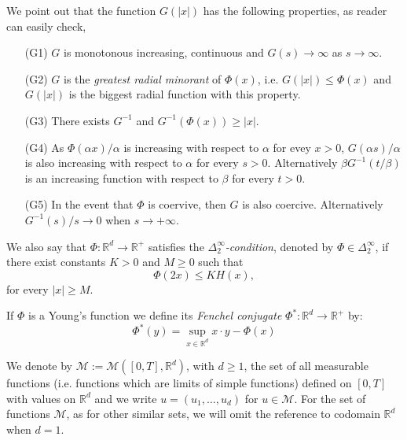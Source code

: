 \documentclass[twoside]{article}
\makeatletter
\theoremstyle{remark}
\def\namedlabel#1#2{\begingroup
    #2%
    \def\@currentlabel{#2}%
    \phantomsection\label{#1}\endgroup
}
\newcommand{\rr}{\mathbb{R}}
\renewcommand{\leq}{\leqslant}
\renewcommand{\geq}{\geqslant}
\makeatother
\begin{document}
We point out that the function $G(|x|)$ has the following properties, as reader can easily check,
\begin{enumerate}
 \item[\namedlabel{it:g1}{(G1)}] $G$ is monotonous increasing, continuous and $G(s) \to \infty$ as $s \to \infty$.
 \item[\namedlabel{it:g2}{(G2)}] $G$ is the \emph{greatest radial minorant} of $\Phi(x)$, i.e.  $G(|x|)\leq \Phi (x)$ and $G(|x|)$ is the biggest radial function with this property.
 \item[\namedlabel{it:g3}{(G3)}] There exists  $G^{-1}$ and  $G^{-1}(\Phi(x))\geq |x|$.
 \item[\namedlabel{it:g4}{(G4)}] As $\Phi(\alpha x)/\alpha$ is increasing with respect to $\alpha$ for evey $x>0$,
$G(\alpha s)/\alpha$ is also increasing
with respect to $\alpha$ for every $s>0$. Alternatively  $\beta G^{-1}(t/\beta)$ is an increasing function with respect to
$\beta$ for every $t>0$.
\item[\namedlabel{it:g5}{(G5)}] In the event that $\Phi$ is coervive, then $G$ is also coercive. Alternatively $G^{-1}(s)/s\to 0$ when $s\to+\infty$.
\end{enumerate}





We also say that $\Phi:\mathbb{R}^d\rightarrow \mathbb{R}^+$ satisfies the  \emph{$\Delta_2^{\infty}$-condition}, denoted by $\Phi \in \Delta_2^{\infty}$,
if there exist  constants $K>0$ and  $M\geq 0$ such that
\begin{equation}\label{delta2defi}\Phi(2x)\leq KH(x),
\end{equation}
for every $|x|\geq M$.

If $\Phi$ is a Young's function we define its \emph{Fenchel conjugate}   $\Phi^*:\mathbb{R}^d\to \mathbb{R}^+ $ by:
\begin{equation}\label{eq:conjugada}
 \Phi^*(y)=\sup\limits_{x\in\mathbb{R}^d} x\cdot y-\Phi(x)
\end{equation}


 We denote by $\mathcal{M}:=\mathcal{M}([0,T],\rr^d)$, with $d\geq 1$,  the set of all measurable functions (i.e. functions which are limits of simple functions)  defined on $[0,T]$ with values on $\mathbb{R}^d$ and  we write $u=(u_1,\dots,u_d)$ for  $u\in \mathcal{M}$. For the set of functions $\mathcal{M}$, as for other similar sets, we will omit the reference to codomain $\mathbb{R}^d$ when $d=1$.
\end{document}
